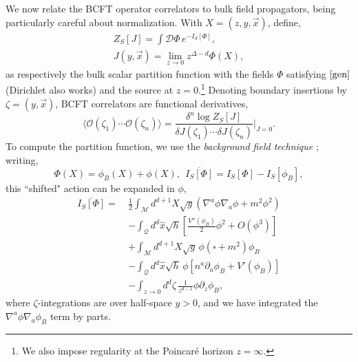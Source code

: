 \documentclass[reprint,amsmath,amssymb,aps,nofootinbib,twocolumn]{revtex4-2}
\begin{document}
We now relate the BCFT operator correlators to bulk field propagators, being particularly careful about normalization. With $X = (z,y,\vec{x})$, define,
\begin{align}
Z_S[J] = \int \mathcal{D}\Phi\,e^{-I_S[\Phi]},
\label{partfunction}\\
J(y,\vec{x}) = \lim_{z\rightarrow 0}z^{\Delta-d} \Phi(X),
\end{align}
as respectively the bulk scalar partition function with the fields $\Phi$ satisfying $\eqref{gen}$ (Dirichlet also works) and the source at $z = 0$.\footnote{We also impose regularity at the Poincaré horizon $ z = \infty $.} Denoting boundary insertions by $\zeta = (y,\vec{x})$, BCFT correlators are functional derivatives,
\begin{equation}
\langle \mathcal{O}(\zeta_1)\cdots \mathcal{O}(\zeta_n)\rangle =  \frac{\delta^{n}\log{Z_S[J]}}{\delta J(\zeta_1)\cdots \delta J(\zeta_n)}\bigg\lvert_{J = 0}.
\label{correlators}
\end{equation}
To compute the partition function, we use the \textit{background field technique} \cite{mcavity_quantum_1993}; writing,
\begin{equation}
\Phi(X) = \phi_B(X) + \phi(X),\ \ \overline{I_S[\Phi]} = I_S[\Phi] - I_S[\phi_B],
\end{equation}
this ``shifted" action can be expanded in $\phi$,
\begin{equation}
\begin{split}
\overline{I_S[\Phi]}
=\ &\frac{1}{2}\int_{\mathcal{M}} d^{d+1}X \sqrt{g}\left(\nabla^a \phi \nabla_a \phi + m^2\phi^2\right)\\
&- \int_{\mathcal{Q}} d^d \hat{x}\sqrt{h}\left[\frac{V''(\phi_B)}{2}\phi^2 + O(\phi^3)\right]\\
&+\int_{\mathcal{M}} d^{d+1} X\sqrt{g}\,\phi(\square + m^2)\phi_B\\
&- \int_\mathcal{Q} d^d\hat{x}\sqrt{h}\,\phi\left[n^a \partial_a \phi_B + V'(\phi_B)\right]\\
&- \int_{z\to 0} d^{d}\zeta\,\frac{1}{z^{d-1}}\phi\partial_z\phi_B,
\end{split}\label{actionShift}
\end{equation}
where $ \zeta $-integrations are over half-space $ y>0 $, and we have integrated the $\nabla^a \phi \nabla_a \phi_B$ term by parts.
\end{document}

